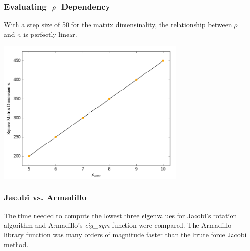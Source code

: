 \documentclass[10pt,xcolor={x11names}]{beamer}
\begin{document}
		\begin{frame} \frametitle{Evaluating $\; \rho \;$ Dependency}
			With a step size of 50 for the matrix dimensinality, the relationship between $\rho$ and $n$ is perfectly linear.
			\begin{center}\includegraphics[width=0.7\textwidth]{Code/RhoDepend.png}\end{center}
		\end{frame}

		\begin{frame} \frametitle{Jacobi vs. Armadillo}
			The time needed to compute the lowest three eigenvalues for Jacobi's rotation algorithm and Armadillo's {\em eig\_sym} function were compared. The Armadillo library function was many orders of magnitude faster than the brute force Jacobi method.
		\end{frame}
\end{document}
